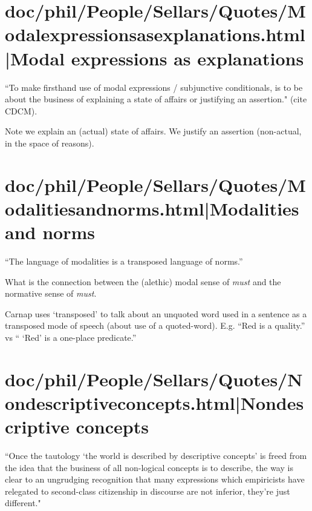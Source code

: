 \documentclass[12pt,a4paper]{report}
\begin{document}
\chapter{doc/phil/People/Sellars/Quotes/Modalexpressionsasexplanations.html|Modal expressions as explanations}
``To make firsthand use of modal expressions / subjunctive conditionals, is to
be about the business of explaining a state of affairs or justifying an
assertion." (cite CDCM).

Note we explain an (actual) state of affairs. We justify an assertion
(non-actual, in the space of reasons).

\chapter{doc/phil/People/Sellars/Quotes/Modalitiesandnorms.html|Modalities and norms}
``The language of modalities is a transposed language of norms.''


What is the connection between the (alethic) modal sense of \emph{must} and the
 normative sense of \emph{must}.

Carnap uses `transposed' to talk about an unquoted word used in a sentence as a
transposed mode of speech (about use of a quoted-word). E.g. ``Red is a
quality.'' vs `` `Red' is a one-place predicate.''

\chapter{doc/phil/People/Sellars/Quotes/Nondescriptiveconcepts.html|Nondescriptive concepts}
``Once the tautology `the world is described by descriptive concepts' is freed
from the idea that the business of all non-logical concepts is to describe, the
 way is clear to an ungrudging recognition that many expressions which
 empiricists have relegated to second-class citizenship in discourse are not
 inferior, they're just different."
\end{document}
